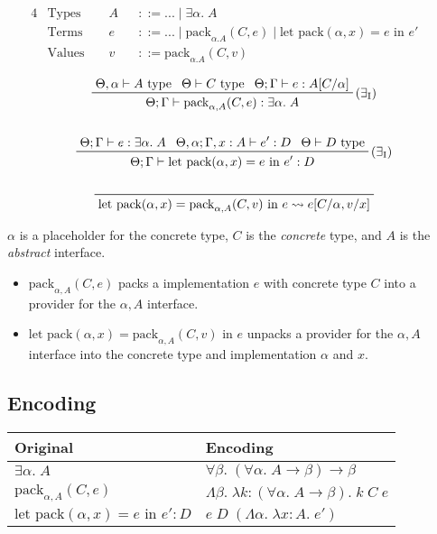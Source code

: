 \documentclass[a4paper,11pt]{article}
\begin{document}
{
    \begin{alignat*}{4}
    &\text{Types } &&A &&::= ... \mid \exists\alpha.\;A && \\
    &\text{Terms } &&e &&::= ... \mid \text{pack}_{\alpha.A}(C,e) \mid \text{let pack}(\alpha,x) = e\text{ in }e' && \\
    &\text{Values } &&v &&::= \text{pack}_{\alpha.A}(C,v) &&
    \end{alignat*}

    \begin{gather*}
    \prftree[r]{(\(\exists_\text{I}\))}
    {\Theta,\alpha\vdash A\text{ type}}
    {\Theta\vdash C\text{ type}}
    {\Theta;\Gamma\vdash e:A[C/\alpha]}
    {\Theta;\Gamma\vdash \text{pack}_{\alpha,A}(C,e) : \exists\alpha.\;A}
    \\
    \\
    \prftree[r]{(\(\exists_\text{I}\))}
    {\Theta;\Gamma\vdash e:\exists\alpha.\;A}
    {\Theta,\alpha;\Gamma,x:A \vdash e' : D}
    {\Theta\vdash D\text{ type}}
    {\Theta;\Gamma\vdash \text{let pack}(\alpha,x) = e\text{ in }e':D}
    \\
    \\
    \prftree[r]{}
    {\text{let pack}(\alpha,x) = \text{pack}_{\alpha,A}(C,v) \text{ in } e \leadsto e[C/\alpha,v/x]}
    \end{gather*}

    \(\alpha\) is a placeholder for the concrete type, \(C\) is the \textit{concrete} type, and \(A\) is the
    \textit{abstract} interface.

    \begin{itemize}
    \item
    {
        \(\text{pack}_{\alpha,A}(C,e)\) packs a implementation \(e\) with concrete type \(C\) into a provider for the
        \(\alpha,A\) interface.
    }
    \item
    {
        \(\text{let pack}(\alpha, x) = \text{pack}_{\alpha,A}(C,v)\text{ in }e\) unpacks a provider for the \(\alpha,A\)
        interface into the concrete type and implementation \(\alpha\) and \(x\).
    }
    \end{itemize}

    \subsection*{Encoding}
    {
        \begin{tabular}{l | l}
        Original & Encoding \\
        \hline
        \(\exists\alpha.\;A\) & \(\forall\beta.\;(\forall\alpha.\;A\rightarrow\beta)\rightarrow\beta\) \\
        \(\text{pack}_{\alpha,A}(C,e)\) & \(\Lambda\beta.\;\lambda k:(\forall\alpha.\;A\rightarrow\beta).\;k\;C\;e\) \\
        \(\text{let pack}(\alpha,x) = e\text{ in }e' : D\) & \(e\;D\;(\Lambda\alpha.\;\lambda x:A.\;e')\) \\
        \end{tabular}
    }
}
\end{document}
